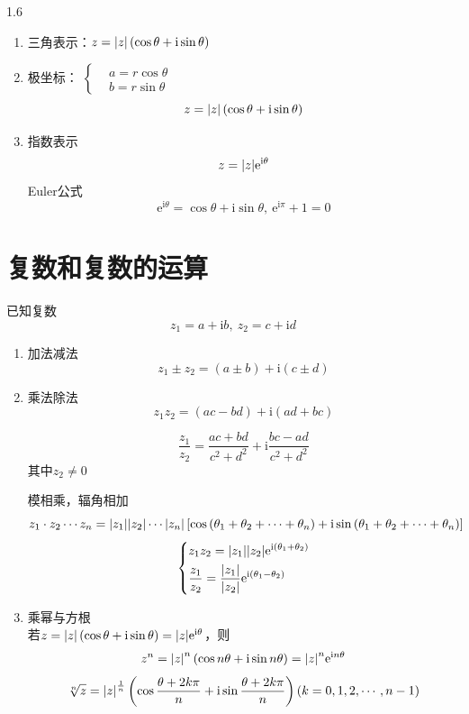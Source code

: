 \documentclass[lang=cn,10pt]{elegantbook}
\renewcommand{\i}{\mathrm{i}}
\begin{document}
\begin{spacing}{1.6}
\begin{enumerate}
\begin{enumerate}[(1)]
\begin{property}
\end{property}
    \item 辐角：$\mathrm{Arg} z=\arg z\pm 2k\pi$，其主值为
    $$\arg z=\left\{
    \begin{aligned}
    &\arctan\frac{y}{x}&&\mbox{一、四象限}\\
    &\arctan\frac{y}{x}+\pi&&\mbox{二象限}\\
    &\arctan\frac{y}{x}-\pi&&\mbox{三象限}\\
    &\frac{\pi}{2}&&x=0,\ y>0\\
    &-\frac{\pi}{2}&&x=0,\ y<0\\
    &\pi&&x<0,\ y=0
    \end{aligned}
    \right.
    $$
\end{enumerate}
    \item 三角表示：$z=\abs{z}\left(\cos\theta+\i\sin\theta\right)$
    \item 极坐标：
    $\left\{
    \begin{aligned}
    &a=r\cos\theta\\
    &b=r\sin\theta
    \end{aligned}
    \right.
    $
    $$z=\abs{z}\left(\cos\theta+\i\sin\theta\right)$$
\item 指数表示
$$z=\abs{z}\mathrm{e}^{\i\theta}$$
Euler公式
    $$\mathrm{e}^{\i\theta}=\cos\theta+\i\sin\theta,\ \mathrm{e}^{\i\pi}+1=0$$
\end{enumerate}
\section{复数和复数的运算}
已知复数
$$z_1=a+\i b,\ z_2=c+\i d$$
\begin{enumerate}
    \item 加法减法
    $$z_1\pm z_2=\left(a\pm b\right)+\i\left(c\pm d\right)$$
    \item 乘法除法
    $$z_1z_2=\left(ac-bd\right)+\i\left(ad+bc\right)$$
    
    $$\frac{z_1}{z_2}=\frac{ac+bd}{c^2+d^2}+\i\frac{bc-ad}{c^2+d^2}$$
    其中$z_2\neq 0$
    \begin{property}
    模相乘，辐角相加
    $$z_1\cdot z_2\cdots z_n=\abs{z_1}\abs{z_2}\cdots\abs{z_n}\left[\cos\left(\theta_1+\theta_2+\cdots+\theta_n\right)+\i\sin\left(\theta_1+\theta_2+\cdots+\theta_n\right)\right]$$
    $$
    \left\{
    \begin{aligned}
    &z_1z_2=\abs{z_1}\abs{z_2}\mathrm{e}^{\i\left(\theta_1+\theta_2\right)}\\
    &\frac{z_1}{z_2}=\frac{\abs{z_1}}{\abs{z_2}}\mathrm{e}^{\i\left(\theta_1-\theta_2\right)}
    \end{aligned}
    \right.
    $$
    \end{property}
    \item 乘幂与方根\\
    若$z=\abs{z}\left(\cos\theta+\i\sin\theta\right)=\abs{z}\mathrm{e}^{\i\theta}$，则
    $$z^n=\abs{z}^n\left(\cos n\theta+\i\sin n\theta\right)=\abs{z}^n\mathrm{e}^{\i n\theta}$$
    $$\sqrt[n]{z}=\abs{z}^{\frac{1}{n}}\left(\cos\frac{\theta+2k\pi}{n}+\i\sin\frac{\theta+2k\pi}{n}\right)(k=0,1,2,\cdots,n-1)$$
\end{enumerate}

\end{spacing}
\end{document}
